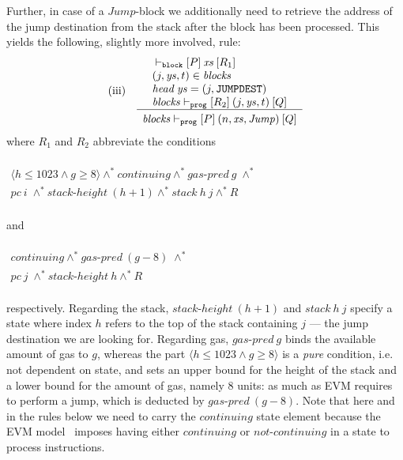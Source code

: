 \documentclass[sigplan,10pt,review]{acmart}\settopmatter{printfolios=true,printccs=false,printacmref=false}
\newcommand{\sconj}{\wedge^*}
\newcommand{\ttrip}[5]{\mathit{#1} \vdash_{\mathrm{#2}}[#3]\:#4\:[#5]}
\newcommand{\cont}{\mathit{continuing}}
\newcommand{\ncont}{\mathit{not\mbox{-}continuing}}
\newcommand{\pc}{\mathit{pc}}
\newcommand{\gaspred}{\mathit{gas\mbox{-}pred}}
\newcommand{\stackh}{\mathit{stack\mbox{-}height}}
\newcommand{\stack}{\mathit{stack}}
\newcommand{\instr}[1]{\mathtt{#1}}
\newcommand{\pure}[1]{\langle#1\rangle}
\newcommand{\hd}{\mathit{head}\:}
\newcommand{\RuleC}[2]{\begin{array}{c}#1\\\hline\noalign{\smallskip}#2\end{array}}
\begin{document}
Further, in case of a $\mathit{Jump}$-block we additionally need to retrieve the address of the jump 
destination from the stack 
after the block has been processed. This yields the following, slightly more involved, rule:
\[
\begin{array}{l l}
\mbox{(iii)} & \RuleC{\begin{array}{l}\ttrip{}{\mathtt{block}}{P}{\mathit{xs}}{R_1} \\
                                      (j, \mathit{ys},t) \in \mathit{blocks} \\
                                      \hd\mathit{ys} = (j, \instr{JUMPDEST}) \\
                                      \ttrip{\mathit{blocks}}{\mathtt{prog}}{R_2}{(j, \mathit{ys},t)}{Q}
                      \end{array}}
     {\ttrip{\mathit{blocks}}{\mathtt{prog}}{P}{(n, \mathit{xs}, \mathit{Jump})}{Q}}
\end{array}
\]
where $R_1$ and $R_2$ abbreviate the conditions \\
\\$
\begin{array}{l}
\pure{h \le 1023 \wedge g \geq 8} \sconj \cont \sconj \gaspred\:g \; \sconj \\
\pc\:i \; \sconj \stackh\:(h + 1) \sconj \stack\:h\:j \sconj R 
\end{array}
$\\ 
\\
and\\
\\$
\begin{array}{l}
\cont \sconj \gaspred\:(g - 8) \; \sconj \\
\pc\:j \; \sconj \stackh\:h \sconj R 
\end{array}
$\\
\\respectively. 
Regarding the stack, $\stackh\:(h + 1)$ and $\stack\:h\:j$ specify a state where
index $h$ refers to the top of the stack containing $j$ --- the jump destination we are looking for.
Regarding gas, $\gaspred\:g$
binds the available amount of gas to $g$, whereas 
the part $\pure{h \le 1023 \wedge g \geq 8}$ is a \emph{pure} condition,
i.e. not dependent on state, and sets an upper bound for the height of
the stack and a lower bound for the amount of gas, namely $8$ units: 
as much as EVM requires to perform a jump, which is deducted by $\gaspred\:(g - 8)$.   
Note that here and in the rules below we need to carry the $\cont$ state element because the EVM model~\cite{Yoichi}
imposes having either $\cont$ or $\ncont$ in a state to process instructions.
\end{document}
